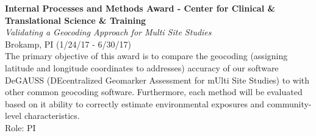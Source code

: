\documentclass{nihbiosketch}
\begin{document}
\bigskip

\textbf{Internal Processes and Methods Award - Center for Clinical \&
Translational Science \& Training}\\
\emph{Validating a Geocoding Approach for Multi Site Studies}\\
Brokamp, PI (1/24/17 - 6/30/17)\\
The primary objective of this award is to compare the geocoding
(assigning latitude and longitude coordinates to addresses) accuracy of
our software DeGAUSS (DEcentralized Geomarker Assessment for mUlti Site
Studies) to with other common geocoding software. Furthermore, each
method will be evaluated based on it ability to correctly estimate
environmental exposures and community-level characteristics.\\
Role: PI

\bigskip
\end{document}
